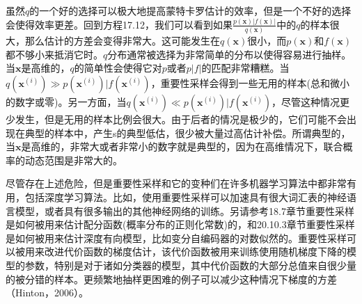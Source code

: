 虽然\(q\)的一个好的选择可以极大地提高蒙特卡罗估计的效率，但是一个不好的选择会使得效率更差。回到方程17.12，我们可以看到如果\( \frac { p(\bm{x})|f(\bm{x})| }{ q(\bm{x}) } \)中的\(q\)的样本很大，那么估计的方差会变得非常大。这可能发生在\(q(\bm{x})\)很小，而\(p(\bm{x})\)和\(f(\bm{x})\)都不够小来抵消它时。\(q\)分布通常被选择为非常简单的分布以使得容易进行抽样。当\(\bm{x}\)是高维的，\(q\)的简单性会使得它对\(p\)或者\(p|f|\)的匹配非常糟糕。当\(q({\bm{x}}^{ (i) })\gg p({\bm{x}}^{ (i) })|f({\bm{x}}^{ (i) })\)，重要性采样会得到一些无用的样本(总和微小的数字或零)。另一方面，当\(q({\bm{x}}^{ (i) })\ll p({\bm{x}}^{ (i) })|f({\bm{x}}^{ (i) })\)，尽管这种情况更少发生，但是无用的样本比例会很大。由于后者的情况是极少的，它们可能不会出现在典型的样本中，产生s的典型低估，很少被大量过高估计补偿。所谓典型的，当\(\bm{x}\)是高维的，非常大或者非常小的数字就是典型的，因为在高维情况下，联合概率的动态范围是非常大的。

尽管存在上述危险，但是重要性采样和它的变种们在许多机器学习算法中都非常有用，包括深度学习算法。比如，使用重要性采样可以加速具有很大词汇表的神经语言模型，或者具有很多输出的其他神经网络的训练。另请参考18.7章节重要性采样是如何被用来估计配分函数(概率分布的正则化常数)的，和20.10.3章节重要性采样是如何被用来估计深度有向模型，比如变分自编码器的对数似然的。重要性采样可以被用来改进代价函数的梯度估计，该代价函数被用来训练使用随机梯度下降的模型的参数，特别是对于诸如分类器的模型，其中代价函数的大部分总值来自很少量的被分错的样本。更频繁地抽样更困难的例子可以减少这种情况下梯度的方差（Hinton，2006）。
